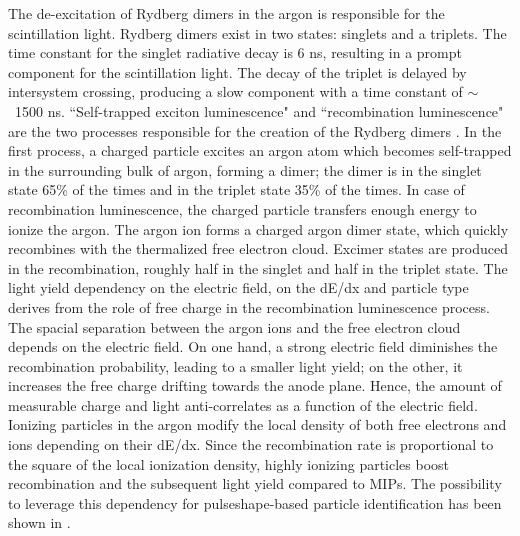 The de-excitation of Rydberg dimers in the argon is responsible for the scintillation light. 
Rydberg dimers exist in two states:  singlets and a triplets. The time constant for the singlet radiative decay is 6 ns, resulting in a prompt component for the scintillation light. The decay of the triplet is delayed by intersystem crossing, producing a slow component with a time constant of $\sim$~1500 ns.  ``Self-trapped exciton luminescence" and  ``recombination luminescence" are the two processes responsible for the creation of the Rydberg dimers \cite{Jones:2015bya}. In the first process, a charged particle excites an argon atom which becomes self-trapped in the surrounding bulk of argon,  forming a dimer; the dimer is in the singlet state 65\% of the times and in the triplet state 35\% of the times. In case of recombination luminescence, the charged particle transfers enough energy to ionize the argon. The argon ion forms a charged argon dimer state, which quickly recombines with the thermalized free electron cloud. Excimer states are produced in the recombination, roughly half in the singlet and half in the triplet state. The light yield dependency on the electric field, on the dE/dx and particle type derives from the role of free charge in the recombination luminescence process. The spacial separation between the argon ions and the free electron cloud depends on the electric field. On one hand, a strong electric field diminishes the recombination probability, leading to a smaller light yield; on the other, it increases the free charge drifting towards the anode plane. Hence, the amount of  measurable charge and light anti-correlates as a function of the electric field.  Ionizing particles in the argon modify the local density of both free electrons and ions depending on their dE/dx. Since the recombination rate is proportional to the square of the local ionization density, highly ionizing particles boost recombination and the subsequent light yield compared to MIPs.  The possibility to leverage this dependency for pulseshape-based particle identification has been shown in \cite{Boulay:2004dk, PhysRevC.78.035801}.

